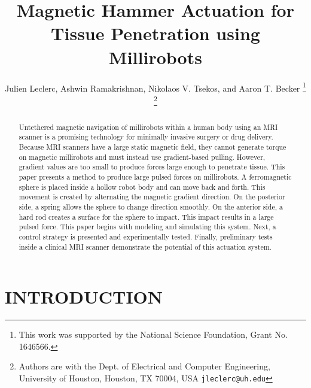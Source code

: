 \documentclass[letterpaper, 10 pt, conference]{ieeeconf}  %
\title{\LARGE \bf
Magnetic Hammer Actuation for Tissue Penetration using Millirobots
}
\author{Julien Leclerc, Ashwin Ramakrishnan, Nikolaos V. Tsekos, and Aaron T. Becker %
\thanks{This work was supported by the National Science Foundation, Grant No. 1646566. }%
\thanks{Authors are with the Dept. of Electrical and Computer
Engineering, University of Houston, Houston, TX 70004, USA
        {\tt\small jleclerc@uh.edu}}%
}
\begin{document}
\maketitle
\thispagestyle{empty}
\pagestyle{empty}


\begin{abstract}

Untethered magnetic navigation of millirobots within a human body using an MRI scanner is a promising technology for minimally invasive surgery or drug delivery.
Because MRI scanners have a large static magnetic field, they cannot generate torque on magnetic millirobots and must instead use gradient-based pulling.
 However, gradient values are too small to produce forces large enough to penetrate tissue. 
 This paper presents a method to produce large pulsed forces on millirobots. 
 A ferromagnetic sphere is placed inside a hollow robot body and can move back and forth. 
 This movement is created by alternating the magnetic gradient direction. 
 On the posterior side, a spring allows the sphere to change direction smoothly. 
 On the anterior side, a hard rod creates a surface for the sphere to impact. 
 This impact results in a large pulsed force. 
 This paper begins with modeling and simulating this system. 
 Next, a control strategy is presented and experimentally tested.
  Finally, preliminary tests inside a clinical MRI scanner demonstrate the potential of this actuation system. 

\end{abstract}


\section{INTRODUCTION}
\end{document}
